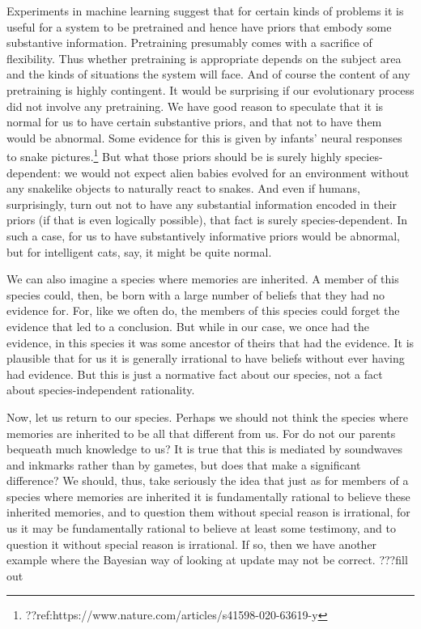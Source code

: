 Experiments in machine learning suggest that for certain kinds of problems it is useful for a system to be pretrained
and hence have priors that embody some substantive information. Pretraining presumably comes with a sacrifice of flexibility.
Thus whether pretraining is appropriate depends on the subject area and the kinds of situations the system will face. And
of course the content of any pretraining is highly contingent. It would be surprising if our evolutionary process did not 
involve any pretraining. We have good reason to speculate that it is normal for us to have certain substantive 
priors, and that not to have them would be abnormal. Some evidence for this is given by infants' neural responses to
snake pictures.\footnote{??ref:https://www.nature.com/articles/s41598-020-63619-y} But what those priors should be is surely highly 
species-dependent: we would not expect alien babies evolved for an environment without any snakelike objects to naturally
react to snakes. And even if humans, surprisingly, turn out not to have any substantial information encoded in their priors (if that is even logically 
possible), that fact is surely species-dependent. In such a case, for us to have substantively informative priors would be
abnormal, but for intelligent cats, say, it might be quite normal. 

We can also imagine a species where memories are inherited. A member of this species could, then, be born with a 
large number of beliefs that they had no evidence for. For, like we often do, the members of this species could forget the
evidence that led to a conclusion. But while in our case, we once had the evidence, in this species it was some ancestor
of theirs that had the evidence. It is plausible that for us it is generally irrational to have beliefs without ever having had
evidence. But this is just a normative fact about our species, not a fact about species-independent rationality.

Now, let us return to our species. Perhaps we should not think the species where memories are inherited to be all that
different from us. For do not our parents bequeath much knowledge to us? It is true that this is mediated by soundwaves and
inkmarks rather than by gametes, but does that make a significant difference? We should, thus, take seriously the idea
that just as for members of a species where memories are inherited it is fundamentally rational to believe these inherited
memories, and to question them without special reason is irrational, for us it may be fundamentally rational to believe
at least some testimony, and to question it without special reason is irrational. If so, then we have another example
where the Bayesian way of looking at update may not be correct.
???fill out

